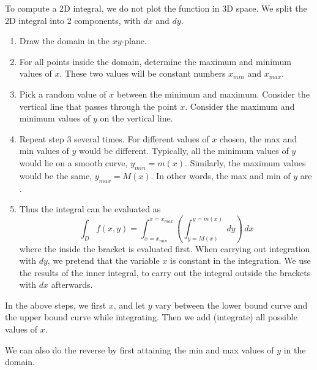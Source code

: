 To compute a 2D integral, we do not plot the function in 3D space. We split the 2D integral into 2 components, with $dx$ and $dy$.

\begin{enumerate}
    \item Draw the domain in the $xy$-plane.

    \item For all points inside the domain, determine the maximum and minimum values of $x$. These two values will be constant numbers $x_{min}$ and $x_{max}$.

    \item Pick a random value of $x$ between the minimum and maximum. Consider the vertical line that passes through the point $x$. Consider the maximum and minimum values of $y$ on the vertical line.

    \item Repeat step 3 several times. For different values of $x$ chosen, the max and min values of $y$ would be different. Typically, all the minimum values of $y$ would lie on a smooth curve, $y_{min} = m(x)$. Similarly, the maximum values would be the same, $y_{max} = M(x)$. In other words, the max and min of $y$ are .

    \item Thus the integral can be evaluated as $$\int_D f(x, y) = \int_{x=x_{min}}^{x=x_{max}} \left( \int_{y=M(x)}^{y=m(x)} \,dy \right) \,dx$$ where the  inside the bracket is evaluated first. When carrying out integration with $dy$, we pretend that the variable $x$ is constant in the integration. We use the results of the inner integral, to carry out the integral outside the brackets with $dx$ afterwards.
\end{enumerate}

In the above steps, we first  $x$, and let $y$ vary between the lower bound curve and the upper bound curve while integrating. Then we add (integrate) all possible values of $x$.

We can also do the reverse by first attaining the min and max values of $y$ in the domain.

